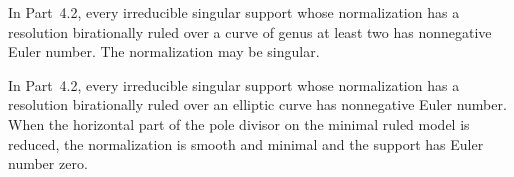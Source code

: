 \begin{proposition}[P4R.7]\hypertarget{tag-02YJ}{}\label{night:P4R.7}\label{stmt:P4R.7}


In Part~4.2, every irreducible singular
support whose normalization has a
resolution birationally ruled over a
curve of genus at least two has
nonnegative Euler number. The
normalization may be singular.
\end{proposition}

\begin{proposition}[P4R.9]\hypertarget{tag-02YL}{}\label{night:P4R.9}\label{stmt:P4R.9}


In Part~4.2, every irreducible singular
support whose normalization has a
resolution birationally ruled over an
elliptic curve has nonnegative Euler
number. When the horizontal part of
the pole divisor on the minimal ruled
model is reduced, the normalization
is smooth and minimal and the support
has Euler number zero.
\end{proposition}


